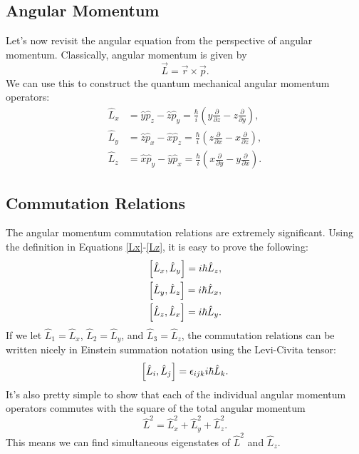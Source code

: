 \subsection{Angular Momentum}
Let's now revisit the angular equation from the perspective of angular momentum. Classically, angular momentum is given by \begin{equation*}
    \vec{L} = \vec{r} \times \vec{p}.
\end{equation*}
We can use this to construct the quantum mechanical angular momentum operators:
\begin{align}
    \hat{L}_x &= \hat{y} \hat{p}_z - \hat{z}\hat{p}_y = \frac{\hbar}{i} \left(y\frac{\partial}{\partial z} - z \frac{\partial}{\partial y} \right), \label{Lx}\\
    \hat{L}_y &= \hat{z} \hat{p}_x - \hat{x}\hat{p}_z= \frac{\hbar}{i} \left(z\frac{\partial}{\partial x} - x \frac{\partial}{\partial z} \right), \label{Ly}\\
    \hat{L}_z &= \hat{x} \hat{p}_y - \hat{y}\hat{p}_x
    = \frac{\hbar}{i} \left(x\frac{\partial}{\partial y} - y \frac{\partial}{\partial x} \right).\label{Lz}
\end{align}

\subsection*{Commutation Relations}
The angular momentum commutation relations are extremely significant. Using the definition in Equations \ref{Lx}-\ref{Lz}, it is easy to prove the following:
\begin{align}
    \left[\hat{L}_x, \hat{L}_y\right] = i\hbar \hat{L}_z,\\
    \left[\hat{L}_y, \hat{L}_z\right] = i\hbar \hat{L}_x,\\
    \left[\hat{L}_z, \hat{L}_x\right] = i\hbar \hat{L}_y.
\end{align}
If we let $\hat{L}_1 = \hat{L}_x$, $\hat{L}_2 = \hat{L}_y$, and $\hat{L}_3 = \hat{L}_z$, the commutation relations can be written nicely in Einstein summation notation using the Levi-Civita tensor:
\begin{equation}
    \left[\hat{L}_i, \hat{L}_j\right] = \epsilon_{ijk} i\hbar \hat{L}_k.
\end{equation}
It's also pretty simple to show that each of the individual angular momentum operators commutes with the square of the total angular momentum
\[\hat{L}^2 = \hat{L}_x^2 + \hat{L}_y^2 + \hat{L}_z^2. \]
This means we can find simultaneous eigenstates of $\hat{L}^2$ and $\hat{L}_z$.
